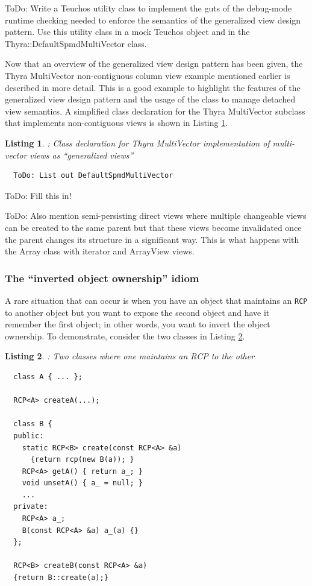 \documentclass[pdf,ps2pdf,11pt]{SANDreport}
\newtheorem{listing}{Listing}
\begin{document}
ToDo: Write a Teuchos utility class to implement the guts of the
debug-mode runtime checking needed to enforce the semantics of the
generalized view design pattern.  Use this utility class in a mock Teuchos
object and in the Thyra::DefaultSpmdMultiVector class.

Now that an overview of the generalized view design pattern has been
given, the Thyra MultiVector non-contiguous column view example
mentioned earlier is described in more detail.  This is a good example
to highlight the features of the generalized view design pattern and
the usage of the {} class to manage detached view semantics.
A simplified class declaration for the Thyra MultiVector subclass that
implements non-contiguous views is shown in Listing
{}\ref{listing:DefaultSpmdMultiVector-decl}.


\begin{listing}:  Class declaration for Thyra MultiVector implementation
of multi-vector views as ``generalized views''  \\
\label{listing:DefaultSpmdMultiVector-decl}
{\small\begin{verbatim}
  ToDo: List out DefaultSpmdMultiVector
\end{verbatim}}
\end{listing}


ToDo: Fill this in!

ToDo: Also mention semi-persisting direct views where multiple
changeable views can be created to the same parent but that these
views become invalidated once the parent changes its structure in a
significant way.  This is what happens with the Array class with
iterator and ArrayView views.


%
{}\subsubsection{The ``inverted object ownership'' idiom}
\label{sec:inverting-obj-ownership}
%

A rare situation that can occur is when you have an object that
maintains an {}\texttt{RCP} to another object but you want to expose
the second object and have it remember the first object; in other
words, you want to invert the object ownership.  To demonstrate,
consider the two classes in Listing {}\ref{listing:B_owns_A_decl}.

\begin{listing}: Two classes where one maintains an RCP to the other \\
\label{listing:B_owns_A_decl}
{\small\begin{verbatim}
  class A { ... };

  RCP<A> createA(...);

  class B {
  public:
    static RCP<B> create(const RCP<A> &a)
      {return rcp(new B(a)); }
    RCP<A> getA() { return a_; }
    void unsetA() { a_ = null; }
    ...
  private:
    RCP<A> a_;
    B(const RCP<A> &a) a_(a) {}
  };

  RCP<B> createB(const RCP<A> &a)
  {return B::create(a);}
\end{verbatim}}
\end{listing}
\end{document}
